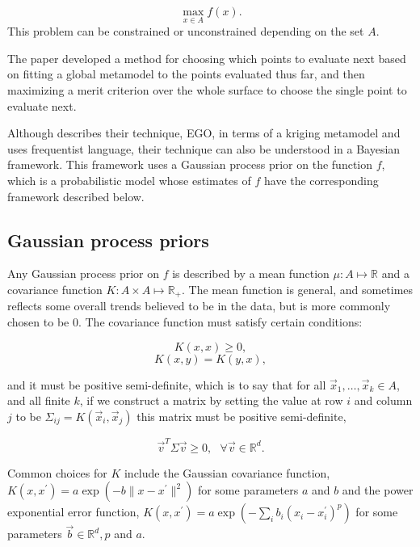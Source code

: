 \begin{equation}
\max_{x \in A} f(x).
\end{equation}
This problem can be constrained or unconstrained depending on the set $A$.

The paper \cite{Jones1998} developed a method for choosing which points to evaluate next based on fitting a global metamodel to the points evaluated thus far, and then maximizing a merit criterion over the whole surface to choose the single point to evaluate next.

Although \cite{Jones1998} describes their technique, EGO, in terms of a kriging metamodel and uses frequentist language, their technique can also be understood in a Bayesian framework. This framework uses a Gaussian process prior on the function $f$, which is a probabilistic model whose estimates of $f$ have the corresponding framework described below.

\subsection{Gaussian process priors}

Any Gaussian process prior on $f$ is described by a mean function $\mu : A \mapsto \mathbb{R}$ and a covariance function $K : A \times A \mapsto \mathbb{R}_{+}$. The mean function is general, and sometimes reflects some overall trends believed to be in the data, but is more commonly chosen to be 0. The covariance function must satisfy certain conditions:

\begin{equation}K(x,x) \geq 0,\end{equation}
\begin{equation}K(x,y) = K(y,x),\end{equation}

    and it must be positive semi-definite, which is to say that for all $\vec{x}_{1}, \ldots, \vec{x}_{k} \in A$, and all finite $k$, if we construct a matrix by setting the value at row $i$ and column $j$ to be $\Sigma_{ij} = K(\vec{x}_{i}, \vec{x}_{j})$ this matrix must be positive semi-definite,

\begin{equation}\vec{v}^{T}\Sigma \vec{v} \geq 0, \ \ \ \forall \vec{v} \in \mathbb{R}^{d}.\end{equation}

Common choices for $K$ include the Gaussian covariance function, $K(x,x^{\prime}) = a \exp(-b \| x - x^{\prime}\|^{2})$ for some parameters $a$ and $b$ and the power exponential error function, $K(x, x^{\prime}) = a \exp(-\sum_{i} b_{i} (x_{i} - x_{i}^{\prime})^{p})$ for some parameters $\vec{b} \in \mathbb{R}^{d}, p$ and $a$.


